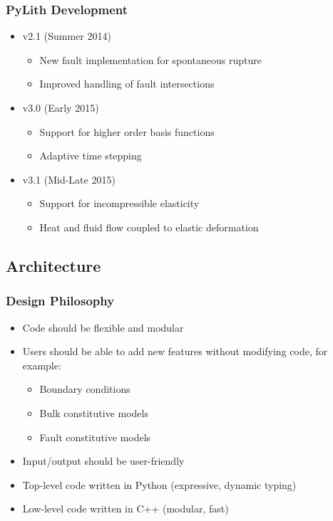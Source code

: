 \documentclass{beamer}
\begin{document}
\begin{frame}
  \frametitle{PyLith Development}

  \begin{itemize}
  \item v2.1 (Summer 2014)
    \begin{itemize}
    \item New fault implementation for spontaneous rupture
    \item Improved handling of fault intersections
    \end{itemize}
  \item v3.0 (Early 2015)
    \begin{itemize}
    \item Support for higher order basis functions
    \item Adaptive time stepping
    \end{itemize}
  \item v3.1 (Mid-Late 2015)
    \begin{itemize}
    \item Support for incompressible elasticity
    \item Heat and fluid flow coupled to elastic deformation
    \end{itemize}
  \end{itemize}

\end{frame}


\subsection{Architecture}

\begin{frame}
  \frametitle{Design Philosophy}

  \begin{itemize}
  \item Code should be flexible and modular
  \item Users should be able to add new features without modifying
    code, for example:
    \begin{itemize}
    \item Boundary conditions
    \item Bulk constitutive models
    \item Fault constitutive models
    \end{itemize}
  \item Input/output should be user-friendly
  \item Top-level code written in Python (expressive, dynamic typing)
  \item Low-level code written in C++ (modular, fast)
\end{itemize}

\end{frame}
\end{document}
